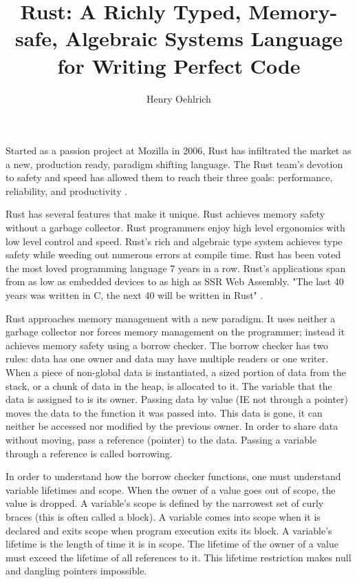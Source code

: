 \documentclass[12pt]{article}
\author{Henry Oehlrich}
\title{Rust: A Richly Typed, Memory-safe, Algebraic Systems Language for Writing Perfect Code}
\begin{document}
\makeheader{}
\thispagestyle{empty}
\setlength{\parindent}{20pt}
Started as a passion project at Mozilla in 2006, Rust has infiltrated the
market as a new, production ready, paradigm shifting language. The Rust team's
devotion to safety and speed has allowed them to reach their three goals:
performance, reliability, and productivity \textit{\cite{rust-lang.org}}.

Rust has several features that make it unique. Rust achieves memory safety
without a garbage collector. Rust programmers enjoy high level ergonomics with
low level control and speed. Rust's rich and algebraic type system achieves
type safety while weeding out numerous errors at compile time. Rust has been
voted the most loved programming language 7 years in a row.
\textit{\cite{so-dev-survey}} Rust's applications span from as low as embedded
devices to as high as SSR Web Assembly. "The last 40 years was written in C,
the next 40 will be written in Rust" \textit{\cite{noboilerplate}}.


Rust approaches memory management with a new paradigm. It uses neither a
garbage collector nor forces memory management on the programmer; instead it
achieves memory safety using a borrow checker. The borrow checker has two
rules: data has one owner and data may have multiple readers or one writer.
When a piece of non-global data is instantiated, a sized portion of data from
the stack, or a chunk of data in the heap, is allocated to it. The variable
that the data is assigned to is its owner. Passing data by value (IE not
through a pointer) moves the data to the function it was passed into. This data
is gone, it can neither be accessed nor modified by the previous owner. In
order to share data without moving, pass a reference (pointer) to the data.
Passing a variable through a reference is called borrowing. 

In order to understand how the borrow checker functions, one must understand
variable lifetimes and scope. When the owner of a value goes out of scope, the
value is dropped. A variable's scope is defined by the narrowest set of curly
braces (this is often called a block). A variable comes into scope when it is
declared and exits scope when program execution exits its block. A variable's
lifetime is the length of time it is in scope. The lifetime of the owner of a
value must exceed the lifetime of all references to it. This lifetime
restriction makes null and dangling pointers impossible.
\end{document}
